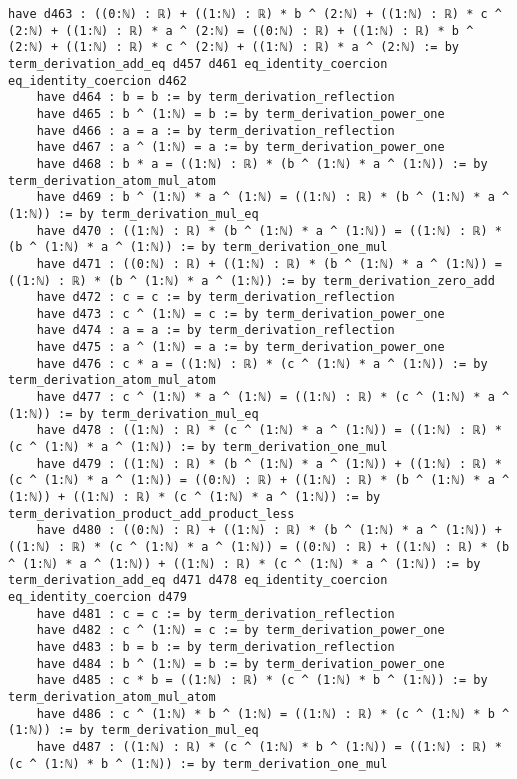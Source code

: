 \documentclass{article}
\begin{document}
\begin{tcolorbox}[colback=white!10, width=\linewidth]
\begin{lstlisting}[language=Lean4]
    have d463 : ((0:ℕ) : ℝ) + ((1:ℕ) : ℝ) * b ^ (2:ℕ) + ((1:ℕ) : ℝ) * c ^ (2:ℕ) + ((1:ℕ) : ℝ) * a ^ (2:ℕ) = ((0:ℕ) : ℝ) + ((1:ℕ) : ℝ) * b ^ (2:ℕ) + ((1:ℕ) : ℝ) * c ^ (2:ℕ) + ((1:ℕ) : ℝ) * a ^ (2:ℕ) := by term_derivation_add_eq d457 d461 eq_identity_coercion eq_identity_coercion d462
    have d464 : b = b := by term_derivation_reflection
    have d465 : b ^ (1:ℕ) = b := by term_derivation_power_one
    have d466 : a = a := by term_derivation_reflection
    have d467 : a ^ (1:ℕ) = a := by term_derivation_power_one
    have d468 : b * a = ((1:ℕ) : ℝ) * (b ^ (1:ℕ) * a ^ (1:ℕ)) := by term_derivation_atom_mul_atom
    have d469 : b ^ (1:ℕ) * a ^ (1:ℕ) = ((1:ℕ) : ℝ) * (b ^ (1:ℕ) * a ^ (1:ℕ)) := by term_derivation_mul_eq
    have d470 : ((1:ℕ) : ℝ) * (b ^ (1:ℕ) * a ^ (1:ℕ)) = ((1:ℕ) : ℝ) * (b ^ (1:ℕ) * a ^ (1:ℕ)) := by term_derivation_one_mul
    have d471 : ((0:ℕ) : ℝ) + ((1:ℕ) : ℝ) * (b ^ (1:ℕ) * a ^ (1:ℕ)) = ((1:ℕ) : ℝ) * (b ^ (1:ℕ) * a ^ (1:ℕ)) := by term_derivation_zero_add
    have d472 : c = c := by term_derivation_reflection
    have d473 : c ^ (1:ℕ) = c := by term_derivation_power_one
    have d474 : a = a := by term_derivation_reflection
    have d475 : a ^ (1:ℕ) = a := by term_derivation_power_one
    have d476 : c * a = ((1:ℕ) : ℝ) * (c ^ (1:ℕ) * a ^ (1:ℕ)) := by term_derivation_atom_mul_atom
    have d477 : c ^ (1:ℕ) * a ^ (1:ℕ) = ((1:ℕ) : ℝ) * (c ^ (1:ℕ) * a ^ (1:ℕ)) := by term_derivation_mul_eq
    have d478 : ((1:ℕ) : ℝ) * (c ^ (1:ℕ) * a ^ (1:ℕ)) = ((1:ℕ) : ℝ) * (c ^ (1:ℕ) * a ^ (1:ℕ)) := by term_derivation_one_mul
    have d479 : ((1:ℕ) : ℝ) * (b ^ (1:ℕ) * a ^ (1:ℕ)) + ((1:ℕ) : ℝ) * (c ^ (1:ℕ) * a ^ (1:ℕ)) = ((0:ℕ) : ℝ) + ((1:ℕ) : ℝ) * (b ^ (1:ℕ) * a ^ (1:ℕ)) + ((1:ℕ) : ℝ) * (c ^ (1:ℕ) * a ^ (1:ℕ)) := by term_derivation_product_add_product_less
    have d480 : ((0:ℕ) : ℝ) + ((1:ℕ) : ℝ) * (b ^ (1:ℕ) * a ^ (1:ℕ)) + ((1:ℕ) : ℝ) * (c ^ (1:ℕ) * a ^ (1:ℕ)) = ((0:ℕ) : ℝ) + ((1:ℕ) : ℝ) * (b ^ (1:ℕ) * a ^ (1:ℕ)) + ((1:ℕ) : ℝ) * (c ^ (1:ℕ) * a ^ (1:ℕ)) := by term_derivation_add_eq d471 d478 eq_identity_coercion eq_identity_coercion d479
    have d481 : c = c := by term_derivation_reflection
    have d482 : c ^ (1:ℕ) = c := by term_derivation_power_one
    have d483 : b = b := by term_derivation_reflection
    have d484 : b ^ (1:ℕ) = b := by term_derivation_power_one
    have d485 : c * b = ((1:ℕ) : ℝ) * (c ^ (1:ℕ) * b ^ (1:ℕ)) := by term_derivation_atom_mul_atom
    have d486 : c ^ (1:ℕ) * b ^ (1:ℕ) = ((1:ℕ) : ℝ) * (c ^ (1:ℕ) * b ^ (1:ℕ)) := by term_derivation_mul_eq
    have d487 : ((1:ℕ) : ℝ) * (c ^ (1:ℕ) * b ^ (1:ℕ)) = ((1:ℕ) : ℝ) * (c ^ (1:ℕ) * b ^ (1:ℕ)) := by term_derivation_one_mul

\end{lstlisting}
\end{tcolorbox}
\end{document}
